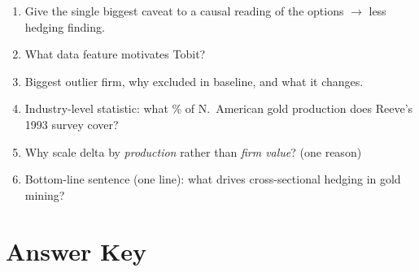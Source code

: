 \documentclass[11pt]{article}
\begin{document}
\begin{drillbox}
\begin{enumerate}
\item Give the single biggest caveat to a causal reading of the options $\to$ less hedging finding. \\[1.5em]
\item What data feature motivates Tobit? \\[1.5em]
\item Biggest outlier firm, why excluded in baseline, and what it changes. \\[1.5em]
\item Industry-level statistic: what \% of N.\ American gold production does Reeve's 1993 survey cover? \\[1.5em]
\item Why scale delta by \emph{production} rather than \emph{firm value}? (one reason) \\[1.5em]
\item Bottom-line sentence (one line): what drives cross-sectional hedging in gold mining? \\[1.5em]
\end{enumerate}
\end{drillbox}

\newpage
\section*{Answer Key}
\end{document}

